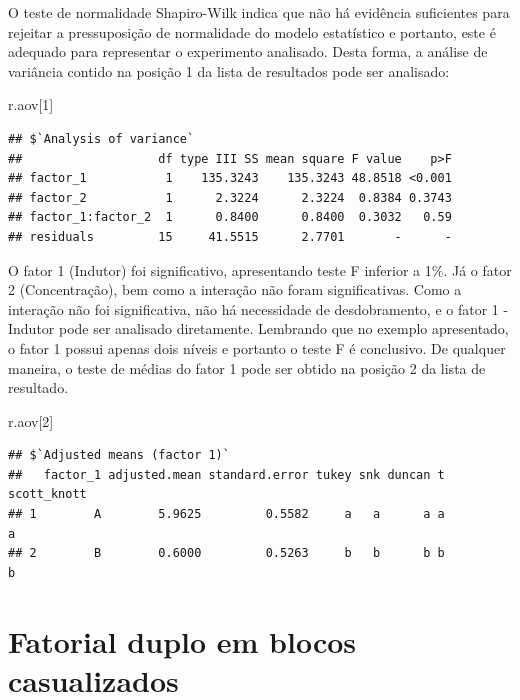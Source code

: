\documentclass[
]{article}
\newenvironment{Shaded}{\begin{snugshade}}{\end{snugshade}}
\newcommand{\DecValTok}[1]{\textcolor[rgb]{0.00,0.00,0.81}{#1}}
\newcommand{\NormalTok}[1]{#1}
\begin{document}
O teste de normalidade Shapiro-Wilk indica que não há evidência suficientes para rejeitar a pressuposição de normalidade do modelo estatístico e portanto, este é adequado para representar o experimento analisado. Desta forma, a análise de variância contido na posição 1 da lista de resultados pode ser analisado:

\begin{Shaded}
\begin{Highlighting}[]
\NormalTok{r.aov[}\DecValTok{1}\NormalTok{]}
\end{Highlighting}
\end{Shaded}

\begin{verbatim}
## $`Analysis of variance`
##                   df type III SS mean square F value    p>F
## factor_1           1    135.3243    135.3243 48.8518 <0.001
## factor_2           1      2.3224      2.3224  0.8384 0.3743
## factor_1:factor_2  1      0.8400      0.8400  0.3032   0.59
## residuals         15     41.5515      2.7701       -      -
\end{verbatim}

O fator 1 (Indutor) foi significativo, apresentando teste F inferior a 1\%. Já o fator 2 (Concentração), bem como a interação não foram significativas. Como a interação não foi significativa, não há necessidade de desdobramento, e o fator 1 - Indutor pode ser analisado diretamente. Lembrando que no exemplo apresentado, o fator 1 possui apenas dois níveis e portanto o teste F é conclusivo. De qualquer maneira, o teste de médias do fator 1 pode ser obtido na posição 2 da lista de resultado.

\begin{Shaded}
\begin{Highlighting}[]
\NormalTok{r.aov[}\DecValTok{2}\NormalTok{]}
\end{Highlighting}
\end{Shaded}

\begin{verbatim}
## $`Adjusted means (factor 1)`
##   factor_1 adjusted.mean standard.error tukey snk duncan t scott_knott
## 1        A        5.9625         0.5582     a   a      a a           a
## 2        B        0.6000         0.5263     b   b      b b           b
\end{verbatim}

\hypertarget{fatorial-duplo-em-blocos-casualizados}{%
\section{Fatorial duplo em blocos casualizados}\label{fatorial-duplo-em-blocos-casualizados}}
\end{document}
